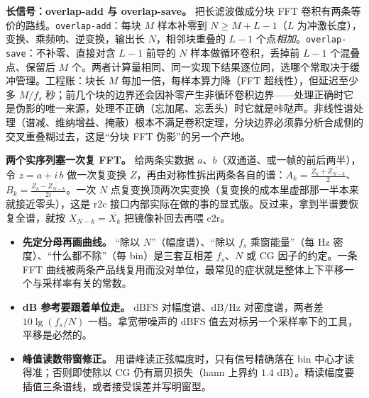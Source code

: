 \documentclass[12pt,a4paper,fontset=fandol]{ctexbook}
\newcommand{\Tp}[1]{\texttt{#1}}
\begin{document}
\textbf{长信号：overlap-add 与 overlap-save。} 把长滤波做成分块 FFT 卷积有两条等价的路线。\Tp{overlap-add}：每块 $M$ 样本补零到 $N \ge M + L - 1$（$L$ 为冲激长度），变换、乘频响、逆变换，输出长 $N$，相邻块重叠的 $L-1$ 个点\emph{相加}。\Tp{overlap-save}：不补零、直接对含 $L-1$ 前导的 $N$ 样本做循环卷积，丢掉前 $L-1$ 个混叠点、保留后 $M$ 个。两者计算量相同、同一实现下结果逐位同，选哪个常取决于缓冲管理。工程账：块长 $M$ 每加一倍，每样本算力降（FFT 超线性），但延迟至少多 $M/f_s$ 秒；前几个块的边界还会因补零产生非循环卷积边界——处理正确时它是伪影的唯一来源，处理不正确（忘加尾、忘丢头）时它就是咔哒声。非线性谱处理（谱减、维纳增益、掩蔽）根本不满足卷积定理，分块边界必须靠分析合成侧的交叉重叠糊过去，这是``分块 FFT 伪影''的另一个产地。

\textbf{两个实序列塞一次复 FFT。} 给两条实数据 $a$、$b$（双通道、或一帧的前后两半），令 $z = a + i\,b$ 做一次复变换 $Z$，再由对称性拆出两条各自的谱：$A_k = \frac{Z_k + \overline{Z_{N-k}}}{2}$、$B_k = \frac{Z_k - \overline{Z_{N-k}}}{2i}$。一次 $N$ 点复变换顶两次实变换（复变换的成本里虚部那一半本来就接近零头），这是 r2c 接口内部实际在做的事的显式版。反过来，拿到半谱要恢复全谱，就按 $X_{N-k} = \overline{X_k}$ 把镜像补回去再喂 c2r。

\begin{note}[title={单位金字塔：从 bin 到每 Hz 再到 dB}]
\begin{itemize}
\item \textbf{先定分母再画曲线。} ``除以 $N$''（幅度谱）、``除以 $f_s$ 乘窗能量''（每 Hz 密度）、``什么都不除''（每 bin）是三套互相差 $f_s$、$N$ 或 $\mathrm{CG}$ 因子的约定。一条 FFT 曲线被两条产品线复用而没对单位，最常见的症状就是整体上下平移一个与采样率有关的常数。
\item \textbf{dB 参考要跟着单位走。} $\mathrm{dBFS}$ 对幅度谱、$\mathrm{dB/Hz}$ 对密度谱，两者差 $10\lg(f_s/N)$ 一档。拿宽带噪声的 $\mathrm{dBFS}$ 值去对标另一个采样率下的工具，平移是必然的。
\item \textbf{峰值读数带窗修正。} 用谱峰读正弦幅度时，只有信号精确落在 bin 中心才读得准；否则即使除以 $\mathrm{CG}$ 仍有扇贝损失（hann 上界约 $1.4$ dB）。精读幅度要插值三条谱线，或者接受误差并写明窗型。
\end{itemize}
\end{note}
\end{document}
